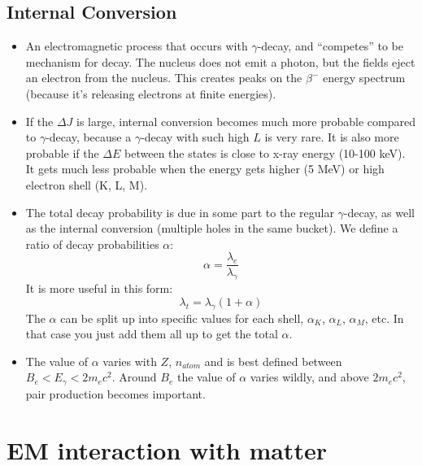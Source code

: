 \documentclass[letter]{article}
\begin{document}
\subsection{Internal Conversion}

\begin{itemize}
\item An electromagnetic process that occurs with $\gamma$-decay, and
  ``competes'' to be mechanism for decay. The nucleus does not emit a
  photon, but the fields eject an electron from the
  nucleus. This creates peaks on the $\beta^-$ energy spectrum
  (because it's releasing electrons at finite energies).~\cite[pp. 341]{lecture}
\item If the $\Delta{}J$ is large, internal conversion
  becomes much more probable compared to $\gamma$-decay, because a
  $\gamma$-decay with such high $L$ is very rare. It is also more
  probable if the $\Delta{}E$ between the states is close to x-ray
  energy (10-100 keV). It gets much less probable when the energy gets
  higher (5 MeV) or high electron shell (K, L, M).
\item The total decay probability is due in some part to the regular
  $\gamma$-decay, as well as the internal conversion (multiple holes
  in the same bucket). We define a ratio of decay probabilities $\alpha$:
  \begin{equation*}
    \alpha = \frac{\lambda_e}{\lambda_\gamma}
  \end{equation*}
It is more useful in this form:
\begin{equation*}
  \lambda_t = \lambda_\gamma(1+\alpha)
\end{equation*}
The $\alpha$ can be split up into specific values for each shell,
$\alpha_K$, $\alpha_L$, $\alpha_M$, etc. In that case you just add
them all up to get the total $\alpha$.
\item The value of $\alpha$ varies with $Z$, $n_{atom}$ and is best
  defined between $B_e < E_\gamma < 2m_ec^2$. Around $B_e$ the value
  of $\alpha$ varies wildly, and above $2m_ec^2$, pair production
  becomes important.~\cite[Lec. 24]{lecture}
\end{itemize}

\section{EM interaction with matter}
\end{document}
